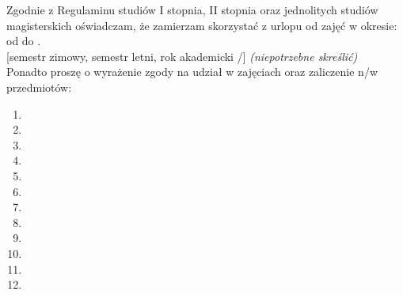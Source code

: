 \documentclass{wmiisubmission}
\begin{document}
\cracowdate
{}
\studentaddress
\addressee[-1.5cm]{\piotrniemiec}




Zgodnie z Regulaminu studiów I stopnia, II stopnia oraz jednolitych studiów
magisterskich oświadczam, że zamierzam skorzystać z urlopu od zajęć w okresie:\\
od \fillField{3cm} do \fillField{3cm}.\\
{[semestr zimowy, semestr letni, rok akademicki \fillField{1cm}/\fillField{1cm}]}
\textit{    (niepotrzebne skreślić)}\\
Ponadto proszę o wyrażenie zgody na udział w zajęciach oraz zaliczenie n/w przedmiotów:

    \begin{multicols}{2}
    \begin{enumerate}
        \item \dotfill
        \item \dotfill
        \item \dotfill
        \item \dotfill
        \item \dotfill
        \item \dotfill
        \item \dotfill
        \item \dotfill
        \item \dotfill
        \item \dotfill
        \item \dotfill
        \item \dotfill
    \end{enumerate}
    \end{multicols}

\vskip 0.3cm

\studentsignature

\vskip 1.0cm


\end{document}
